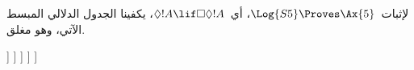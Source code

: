 \documentclass[../../../include/open-logic-section]{subfiles}
\begin{document}
\begin{ex}
  لإثبات~$\Log{S5} \Proves
  \Ax{5}$، أي~$\Diamond!A \lif \Box\Diamond!A$، يكفينا الجدول الدلالي
  المبسط الآتي، وهو مغلق.
  \begin{oltableau}
    [\pFmla{\False}{\Diamond\formula{A} \lif \Box\Diamond \formula{A}}{1},
      just = \TAss
      [\pFmla{\True}{\Diamond \formula{A}}{1}, just = {\TRule{\False}{\lif}[1]}
        [\pFmla{\False}{\Box\Diamond \formula{A}}{1},
          just = {\TRule{\False}{\lif}[1]}
          [\pFmla{\False}{\Diamond \formula{A}}{2},
            just = {\TRule{\False}{\Box}[3]}
            [\pFmla{\True}{\formula{A}}{3},
              just = {\TRule{\True}{\Diamond}[2]}
                [\pFmla{\False}{\formula{A}}{3},
                  just = {\TRule{\False}{\Diamond}[4]}, close]
            ]
          ]
        ]
      ]
    ]
  \end{oltableau}
\end{ex}
\end{document}
